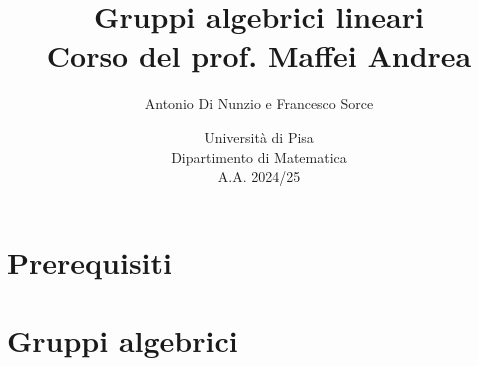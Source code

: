 \documentclass[a4paper]{report}
\title{Gruppi algebrici lineari\\
\large Corso del prof. Maffei Andrea}
\author{Antonio Di Nunzio
 e Francesco Sorce}
\date{Università di Pisa\\
Dipartimento di Matematica\\
A.A. 2024/25}
\begin{document}
\maketitle

\tableofcontents
\newpage


\part{Prerequisiti}


\part{Gruppi algebrici}




\end{document}
